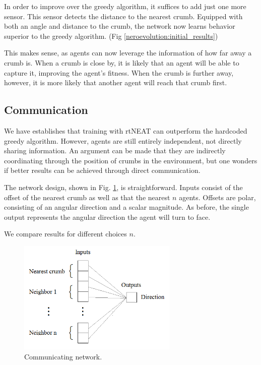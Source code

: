 \documentclass[conference]{IEEEtran}
\begin{document}
In order to improve over the greedy algorithm, it suffices to add just one more sensor. This sensor detects the distance to the nearest crumb. Equipped with both an angle and distance to the crumb, the network now learns behavior superior to the greedy algorithm. (Fig \ref{neroevolution:initial_results})

This makes sense, as agents can now leverage the information of how far away a crumb is. When a crumb is close by, it is likely that an agent will be able to capture it, improving the agent's fitness. When the crumb is further away, however, it is more likely that another agent will reach that crumb first. 


\subsection{Communication}


We have establishes that training with rtNEAT can outperform the hardcoded greedy algorithm. However, agents are still entirely independent, not directly sharing information. An argument can be made that they are indirectly coordinating through the position of crumbs in the environment, but one wonders if better results can be achieved through direct communication.

The network design, shown in Fig. \ref{neroevolution:communication}, is straightforward. Inputs consist of the offset of the nearest crumb as well as that the nearest $n$ agents. Offsets are polar, consisting of an angular direction and a scalar magnitude. As before, the single output represents the angular direction the agent will turn to face. 

We compare results for different choices $n$. 

\begin{figure}[t]
\centering
\includegraphics[width=3.0in]{./figures/neroevolution/comm_network.png}
\caption{Communicating network.}
\label{neroevolution:communication}
\end{figure}
\end{document}
